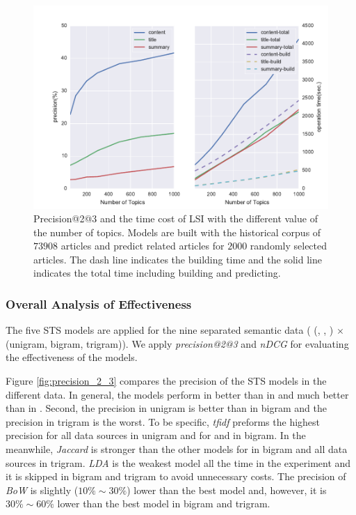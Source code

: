\begin{figure}[!htb]
    \centering
    \includegraphics[width=\textwidth]{fig/precision_topics}
    \caption{Precision@2@3 and the time cost of LSI with the different value of the number of topics. Models are built with the historical corpus of $73908$ articles and predict related articles for $2000$ randomly selected articles. The dash line indicates the building time and the solid line indicates the total time including building and predicting. }
    \label{fig:precision_topics}
\end{figure}


\subsubsection{Overall Analysis of Effectiveness}

The five STS models are applied for the nine separated semantic data ( (\icontent{}, \ititle{}, \isummary{}) $\times$ (unigram, bigram, trigram)). We apply \textit{precision@2@3} and \textit{nDCG} for evaluating the effectiveness of the models. 

Figure \ref{fig:precision_2_3} compares the precision of the STS models in the different data. In general, the models perform in \icontent{} better than in \ititle{} and much better than in \isummary{}. Second, the precision in unigram is better than in bigram and the precision in trigram is the worst. To be specific, \textit{tfidf} preforms the highest precision for all data sources in unigram and for \icontent{} and \ititle{} in bigram. In the meanwhile, \textit{Jaccard} is stronger than the other models for \isummary{} in bigram and all data sources in trigram. \textit{LDA} is the weakest model all the time in the experiment and it is skipped in bigram and trigram to avoid unnecessary costs. The precision of \textit{BoW} is slightly ($10\% \sim 30\%$) lower than the best model and, however, it is $30\% \sim 60\%$ lower than the best model in bigram and trigram. 


